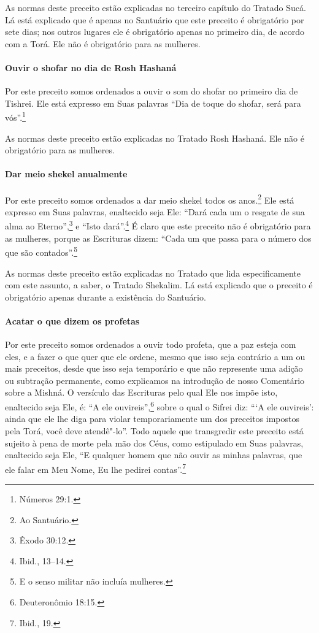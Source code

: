 \begin{multicols}{2}
As normas deste preceito estão explicadas no terceiro capítulo do
Tratado Sucá\starr. Lá está explicado que é apenas no Santuário que este
preceito é obrigatório por sete dias; nos outros lugares ele é
obrigatório apenas no primeiro dia, de acordo com a Torá\starr. Ele não é
obrigatório para as mulheres.

\paragraph{Ouvir o shofar\starr{} no dia de Rosh Hashaná\starr}

Por este preceito somos ordenados a ouvir o som do shofar\starr{} no
primeiro dia de Tishrei\starr. Ele está expresso em Suas palavras ``Dia de
toque do shofar\starr, será para vós''.\footnote{Números 29:1.}

As normas deste preceito estão explicadas no Tratado Rosh Hashaná\starr. Ele
não é obrigatório para as mulheres.

\paragraph{Dar meio shekel\starr{} anualmente}

Por este preceito somos ordenados a dar meio
shekel\starr{} todos os anos.\footnote{Ao Santuário.}
Ele está expresso em Suas palavras, enaltecido seja Ele: ``Dará cada um
o resgate de sua alma ao Eterno'',\footnote{Êxodo 30:12.} e ``Isto dará''.\footnote{Ibid., 13--14.} É claro que este preceito não é obrigatório para as mulheres,
porque as Escrituras dizem: ``Cada um que passa para o número dos que
são contados''.\footnote{E o senso militar não incluía mulheres.}

As normas deste preceito estão explicadas no Tratado que lida
especificamente com este assunto, a saber, o Tratado Shekalim\starr. Lá está
explicado que o preceito é obrigatório apenas durante a existência do
Santuário.

\paragraph{Acatar o que dizem os profetas}

Por este preceito somos ordenados a ouvir todo profeta, que a paz esteja
com eles, e a fazer o que quer que ele ordene, mesmo que isso seja contrário a um ou mais preceitos, desde que isso seja temporário e que não
represente uma adição ou subtração permanente, como explicamos na
introdução de nosso Comentário sobre a Mishná\starr. O versículo das
Escrituras pelo qual Ele nos impõe isto, enaltecido seja Ele, é: ``A ele
ouvireis'',\footnote{Deuteronômio 18:15.} sobre o qual o Sifrei\starr{} diz: ```A ele
ouvireis': ainda que ele lhe diga para violar temporariamente um dos
preceitos impostos pela Torá\starr, você deve atendê"-lo''. Todo aquele que
transgredir este preceito está sujeito à pena de morte pela mão dos
Céus, como estipulado em Suas palavras, enaltecido seja Ele, ``E
qualquer homem que não ouvir as minhas palavras, que ele falar em Meu
Nome, Eu lhe pedirei contas''.\footnote{Ibid., 19.}


\end{multicols}
